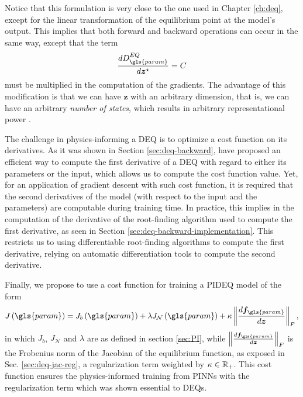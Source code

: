 Notice that this formulation is very close to the one used in Chapter \ref{ch:deq}, except for the linear transformation of the equilibrium point at the model's output.
This implies that both forward and backward operations can occur in the same way, except that the term  \[
    \frac{d D^{EQ}_{\gls{param}}}{d \bm{z}^{\star}} = C
\] must be multiplied in the computation of the gradients.
The advantage of this modification is that we can have $\bm{z}$ with an arbitrary dimension, that is, we can have an arbitrary \emph{number of states}, which results in arbitrary representational power \cite{Ghaoui2019}.

The challenge in physics-informing a \gls{DEQ} is to optimize a cost function on its derivatives.
As it was shown in Section \ref{sec:deq-backward}, \textcite{Bai2019} have proposed an efficient way to compute the first derivative of a \gls{DEQ} with regard to either its parameters or the input, which allows us to compute the cost function value.
Yet, for an application of gradient descent with such cost function, it is required that the second derivatives of the model (with respect to the input and the parameters) are computable during training time.
In practice, this implies in the computation of the derivative of the root-finding algorithm used to compute the first derivative, as seen in Section \ref{sec:deq-backward-implementation}.\footnotemark
{}
This restricts us to using differentiable root-finding algorithms to compute the first derivative, relying on automatic differentiation tools to compute the second derivative.

Finally, we propose to use a cost function for training a \gls{PIDEQ} model of the form \[
    J\left( \gls{param} \right) = J_b\left( \gls{param} \right) + \lambda J_{\mathcal{N}}\left( \gls{param} \right) + \kappa \left\lVert \frac{d \bm{f}_{\gls{param}}}{d \bm{z}}\right\rVert_F
,\] 
in which $J_b$, $J_{\mathcal{N}}$ and $\lambda$ are as defined in section \ref{sec:PI}, while $\left\lVert \frac{d \bm{f}_{\gls{param}}}{d \bm{z}}\right\rVert_F$ is the Frobenius norm of the Jacobian of the equilibrium function, as exposed in Sec. \ref{sec:deq-jac-reg}, a regularization term weighted by $\kappa \in \mathbb{R}_+$.
This cost function ensures the physics-informed training from \gls{PINN}s with the regularization term which was shown essential to \gls{DEQ}s.

